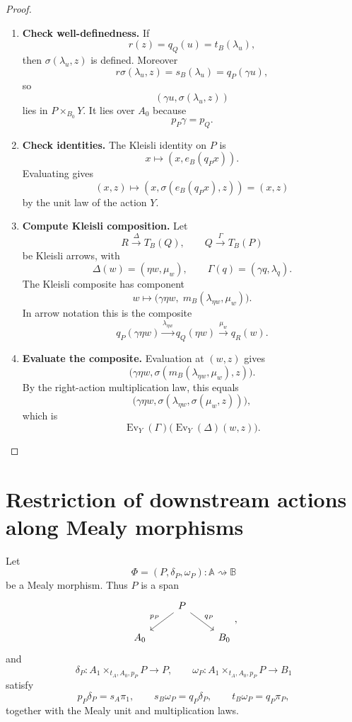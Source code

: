 \begin{proof}
\leavevmode
\begin{enumerate}
\item \textbf{Check well-definedness.}
If
\[
r(z)=q_Q(u)=t_B(\lambda_u),
\]
then \(\sigma(\lambda_u,z)\) is defined. Moreover
\[
r\sigma(\lambda_u,z)=s_B(\lambda_u)=q_P(\gamma u),
\]
so
\[
(\gamma u,\sigma(\lambda_u,z))
\]
lies in \(P\times_{B_0}Y\). It lies over \(A_0\) because
\[
p_P\gamma=p_Q.
\]

\item \textbf{Check identities.}
The Kleisli identity on \(P\) is
\[
x\longmapsto (x,e_B(q_Px)).
\]
Evaluating gives
\[
(x,z)\longmapsto
(x,\sigma(e_B(q_Px),z))
=
(x,z)
\]
by the unit law of the action \(Y\).

\item \textbf{Compute Kleisli composition.}
Let
\[
R\xrightarrow{\Delta}T_B(Q),
\qquad
Q\xrightarrow{\Gamma}T_B(P)
\]
be Kleisli arrows, with
\[
\Delta(w)=(\eta w,\mu_w),
\qquad
\Gamma(q)=(\gamma q,\lambda_q).
\]
The Kleisli composite has component
\[
w\longmapsto
\bigl(\gamma\eta w,\;m_B(\lambda_{\eta w},\mu_w)\bigr).
\]
In arrow notation this is the composite
\[
q_P(\gamma\eta w)
\xrightarrow{\lambda_{\eta w}}
q_Q(\eta w)
\xrightarrow{\mu_w}
q_R(w).
\]

\item \textbf{Evaluate the composite.}
Evaluation at \((w,z)\) gives
\[
\bigl(\gamma\eta w,
\sigma(m_B(\lambda_{\eta w},\mu_w),z)\bigr).
\]
By the right-action multiplication law, this equals
\[
\bigl(\gamma\eta w,
\sigma(\lambda_{\eta w},\sigma(\mu_w,z))\bigr),
\]
which is
\[
\operatorname{Ev}_Y(\Gamma)
\bigl(
\operatorname{Ev}_Y(\Delta)(w,z)
\bigr).
\]
\end{enumerate}
\end{proof}

\section{Restriction of downstream actions along Mealy morphisms}
\label{sec:relative-evaluation-mealy-morphisms}

Let
\[
\Phi=(P,\delta_P,\omega_P):\mathbb A\rightsquigarrow\mathbb B
\]
be a Mealy morphism. Thus \(P\) is a span
\[
\begin{tikzcd}
& P \arrow[dl,"p_P"'] \arrow[dr,"q_P"] & \\
A_0 && B_0
\end{tikzcd}
,
\]
and
\[
\delta_P:A_1\times_{t_A,A_0,p_P}P\to P,
\qquad
\omega_P:A_1\times_{t_A,A_0,p_P}P\to B_1
\]
satisfy
\[
p_P\delta_P=s_A\pi_1,
\qquad
s_B\omega_P=q_P\delta_P,
\qquad
t_B\omega_P=q_P\pi_P,
\]
together with the Mealy unit and multiplication laws.


